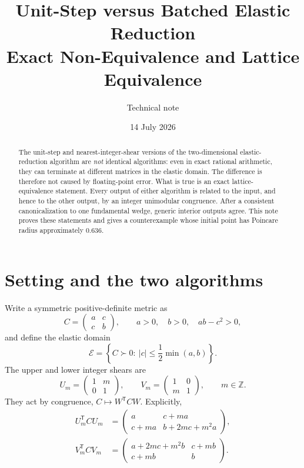 \documentclass[11pt]{article}
\title{Unit-Step versus Batched Elastic Reduction\\
\large Exact Non-Equivalence and Lattice Equivalence}
\author{Technical note}
\date{14 July 2026}
\newcommand{\Eset}{\mathcal{E}}
\newcommand{\trans}{\mathsf{T}}
\begin{document}
\maketitle

\begin{abstract}
The unit-step and nearest-integer-shear versions of the two-dimensional
elastic-reduction algorithm are \emph{not} identical algorithms: even in exact
rational arithmetic, they can terminate at different matrices in the elastic
domain.  The difference is therefore not caused by floating-point error.
What is true is an exact lattice-equivalence statement.  Every output of either
algorithm is related to the input, and hence to the other output, by an integer
unimodular congruence.  After a consistent canonicalization to one fundamental
wedge, generic interior outputs agree.  This note proves these statements and
gives a counterexample whose initial point has Poincare radius approximately
$0.636$.
\end{abstract}

\section{Setting and the two algorithms}

Write a symmetric positive-definite metric as
\[
 C=\begin{pmatrix}a&c\\c&b\end{pmatrix},\qquad
 a>0,\quad b>0,\quad ab-c^2>0,
\]
and define the elastic domain
\[
 \Eset
 =\left\{C\succ0:\ |c|\leq\frac12\min(a,b)\right\}.
\]
The upper and lower integer shears are
\[
 U_m=\begin{pmatrix}1&m\\0&1\end{pmatrix},
 \qquad
 V_m=\begin{pmatrix}1&0\\m&1\end{pmatrix},
 \qquad m\in\mathbb{Z}.
\]
They act by congruence, $C\mapsto W^\trans C W$.  Explicitly,
\begin{align}
 U_m^\trans C U_m
 &=
 \begin{pmatrix}
 a & c+ma\\
 c+ma & b+2mc+m^2a
 \end{pmatrix}, \label{eq:U-update}\\
 V_m^\trans C V_m
 &=
 \begin{pmatrix}
 a+2mc+m^2b & c+mb\\
 c+mb & b
 \end{pmatrix}. \label{eq:V-update}
\end{align}
\end{document}
